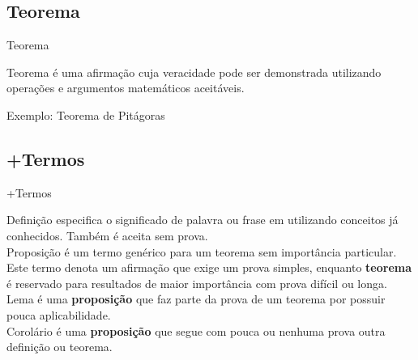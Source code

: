 \subsection{Teorema}

\begin{frame}{Teorema}

\alert{Teorema} é uma afirmação cuja veracidade pode ser demonstrada 
utilizando operações e argumentos matemáticos aceitáveis.

\bigskip
{}
Exemplo: Teorema de Pitágoras\\

\begin{center}
\end{center}

\end{frame}

\subsection{+Termos}
\begin{frame}{+Termos}
  
  \alert{Definição} especifica o significado de palavra ou frase em utilizando
  conceitos já conhecidos. Também é aceita sem prova.\\
  \bigskip
  \pause
  \alert{Proposição} é um termo genérico para um teorema sem importância particular. 
  Este termo denota um afirmação que exige um prova simples, enquanto {\bf teorema} é 
  reservado para resultados de maior importância com prova difícil ou longa.\\
  \bigskip
  \pause
  \alert{Lema} é uma {\bf proposição} que faz parte da prova de um teorema por possuir 
  pouca aplicabilidade.\\
  \bigskip
  \pause
  \alert{Corolário} é uma {\bf proposição} que segue com pouca ou nenhuma prova outra 
  definição ou teorema.\\
\end{frame}





